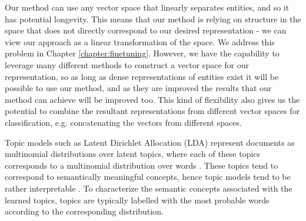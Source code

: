 Our method can use any vector space that linearly separates entities, and so it has potential longevity.  This means that our method is relying on structure in the space that does not directly correspond to our desired representation -  we can view our approach as a linear transformation of the space. We address this problem in Chapter \ref{chapter:finetuning}. However, we have the capability to leverage many different methods to construct a vector space for our representation, so as long as dense representations of entities exist it will be possible to use our method, and as they are improved the results that our method can achieve will be improved too. This kind of flexibility also gives us the potential to combine the resultant representations from different vector spaces for classification, e.g. concatenating the vectors from different spaces.

Topic models such as Latent Dirichlet Allocation (LDA) represent documents as multinomial distributions over latent topics, where each of these topics corresponds to a multinomial distribution over words \cite{Blei2003}. These topics tend to correspond to semantically meaningful concepts, hence topic models tend to be rather interpretable \cite{Chang2009}. To characterize the semantic concepts associated with the learned topics, topics are typically labelled with the most probable words according to the corresponding distribution. 





% 
















